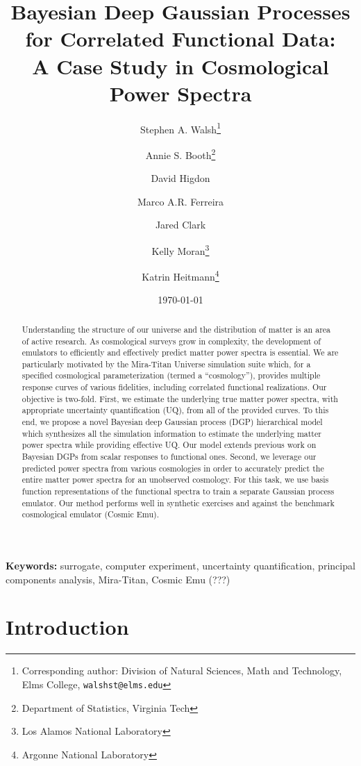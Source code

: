 \documentclass[11pt]{article}
\title{Bayesian Deep Gaussian Processes for Correlated Functional Data: \\
        A Case Study in Cosmological Power Spectra}
\author{Stephen A. Walsh\thanks{Corresponding author: Division of Natural Sciences, 
        Math and Technology, Elms College, {\tt walshst@elms.edu}} \and 
        Annie S. Booth\thanks{Department of Statistics, Virginia Tech} \and
        David Higdon\footnotemark[2] \and
        Marco A.R. Ferreira\footnotemark[2] \and
        Jared Clark\footnotemark[2] \and
        Kelly Moran\thanks{Los Alamos National Laboratory} \and
        Katrin Heitmann\thanks{Argonne National Laboratory}}
\date{\today}
\begin{document}
\maketitle
\bigskip

\begin{abstract} 
Understanding the structure of our universe and the distribution of matter is an 
area of active research.  As cosmological surveys grow in complexity, the development 
of emulators to efficiently and effectively predict matter power spectra is essential.  
We are particularly motivated by the Mira-Titan Universe simulation
suite which, for a specified cosmological parameterization (termed a ``cosmology''), 
provides multiple response curves of various fidelities, including correlated 
functional realizations.  Our objective is two-fold.  First, we estimate 
the underlying true matter power spectra, with appropriate uncertainty 
quantification (UQ), from all of the provided curves.  To this end, we propose a 
novel Bayesian deep Gaussian process (DGP) hierarchical model which synthesizes 
all the simulation information to estimate the underlying matter power spectra
while providing effective UQ.  Our model extends previous work on Bayesian DGPs 
from scalar responses to functional ones.  Second, we leverage our predicted 
power spectra from various cosmologies in order to accurately predict the entire 
matter power spectra for an 
unobserved cosmology.  For this task, we use basis function representations 
of the functional spectra to train a separate Gaussian process emulator.  
Our method performs well in synthetic exercises and against the benchmark cosmological 
emulator (Cosmic Emu).
\end{abstract}

\noindent \textbf{Keywords:} surrogate, computer experiment, uncertainty quantification,
principal components analysis, Mira-Titan, Cosmic Emu (???)


\section{Introduction}

\end{document}
